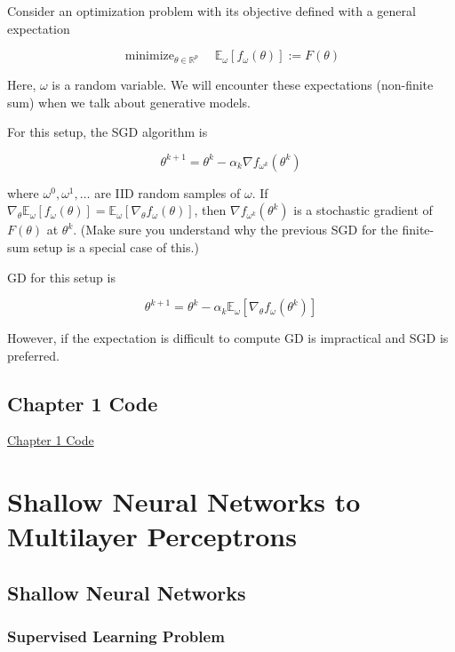 \documentclass{report}
\begin{document}
\begin{concept}
    Consider an optimization problem with its objective defined with a general expectation

    $$
    \operatorname{minimize}_{\theta \in \mathbb{R}^{p}} \quad \mathbb{E}_{\omega}\left[f_{\omega}(\theta)\right]:=F(\theta)
    $$

    Here, $\omega$ is a random variable. We will encounter these expectations (non-finite sum) when we talk about generative models.

    For this setup, the SGD algorithm is

    $$
    \theta^{k+1}=\theta^{k}-\alpha_{k} \nabla f_{\omega^{k}}\left(\theta^{k}\right)
    $$

    where $\omega^{0}, \omega^{1}, \ldots$ are IID random samples of $\omega$. If $\nabla_{\theta} \mathbb{E}_{\omega}\left[f_{\omega}(\theta)\right]=\mathbb{E}_{\omega}\left[\nabla_{\theta} f_{\omega}(\theta)\right]$, then $\nabla f_{\omega^{k}}\left(\theta^{k}\right)$ is a stochastic gradient of $F(\theta)$ at $\theta^{k}$. (Make sure you understand why the previous SGD for the finite-sum setup is a special case of this.)

    GD for this setup is

    $$
    \theta^{k+1}=\theta^{k}-\alpha_{k} \mathbb{E}_{\omega}\left[\nabla_{\theta} f_{\omega}\left(\theta^{k}\right)\right]
    $$

    However, if the expectation is difficult to compute GD is impractical and SGD is preferred.
\end{concept}

\chapter*{Chapter 1 Code}

\href{https://drive.google.com/file/d/1PSpoeseUPIptYQOPuQpxNawxtZbVR_K6/view?usp=sharing}{Chapter 1 Code}

\part{Shallow Neural Networks to Multilayer Perceptrons}

\chapter{Shallow Neural Networks}

\section{Supervised Learning Problem}
\end{document}
